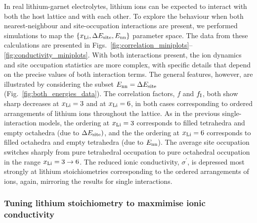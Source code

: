 \documentclass[aps,prb,twocolumn,superscriptaddress,reprint]{revtex4-1}
\newcommand{\xLi}{x_\m{Li}}
\begin{document}
In real lithium-garnet electrolytes, lithium ions can be expected to interact with both the host lattice and with each other. To explore the behaviour when both nearest-neighbour and site-occupation interactions are present, we performed simulations to map the $\left\{\xLi, \Delta E_\m{site}, E_\m{nn}\right\}$ parameter space. 
The data from these calculations are presented in Figs.~\ref{fig:correlation_miniplots}--\ref{fig:conductivity_miniplots}. With both interactions present, the ion dynamics and site occupation statistics are  more complex, with specific details that depend on the precise values of both interaction terms. The general features, however, are illustrated by considering the subset $E_{\mathrm{nn}}=\Delta E_{\mathrm{site}}$ (Fig.~\ref{fig:both_energies_data}). The correlation factors, $f$ and $f_{\mathrm{I}}$, both show sharp decreases at $\xLi=3$ and at $\xLi=6$, in both cases corresponding to ordered arrangements of lithium ions throughout the lattice. As in the previous single-interaction models, the ordering at $\xLi=3$ corresponds to filled tetrahedra and empty octahedra (due to $\Delta E_{\mathrm{site}})$, and the the ordering at $\xLi=6$ corresponds to filled octahedra and empty tetrahedra (due to $E_{\mathrm{nn}}$). The average site occupation switches sharply from pure tetrahedral occupation to pure octahedral occupation in the range $\xLi=3\to6$. The reduced ionic conductivity, $\sigma^\prime$, is depressed most strongly at lithium stoichiometries corresponding to the ordered arrangements of ions, again, mirroring the results for single interactions. 

\subsubsection{Tuning lithium stoichiometry to maxmimise ionic conductivity}
\end{document}
